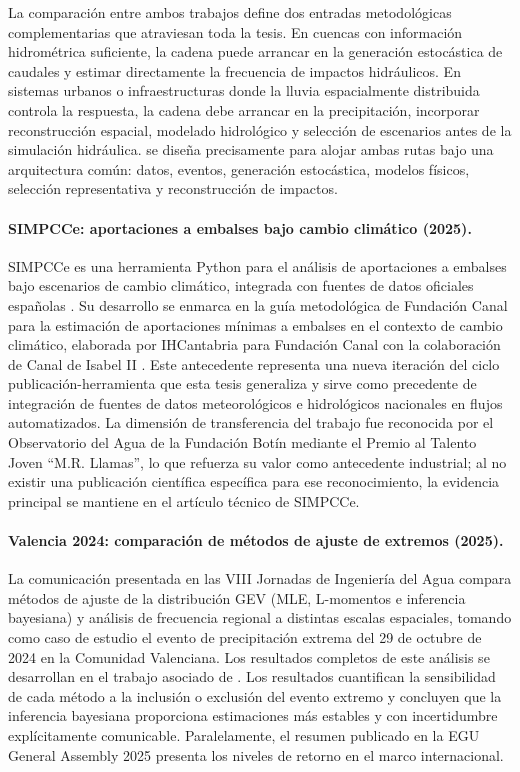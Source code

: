 La comparación entre ambos trabajos define dos entradas metodológicas complementarias que atraviesan toda la tesis. En cuencas con información hidrométrica suficiente, la cadena puede arrancar en la generación estocástica de caudales y estimar directamente la frecuencia de impactos hidráulicos. En sistemas urbanos o infraestructuras donde la lluvia espacialmente distribuida controla la respuesta, la cadena debe arrancar en la precipitación, incorporar reconstrucción espacial, modelado hidrológico y selección de escenarios antes de la simulación hidráulica. \hydra se diseña precisamente para alojar ambas rutas bajo una arquitectura común: datos, eventos, generación estocástica, modelos físicos, selección representativa y reconstrucción de impactos.

\paragraph{SIMPCCe: aportaciones a embalses bajo cambio climático (2025).}
SIMPCCe es una herramienta Python para el análisis de aportaciones a embalses bajo escenarios de cambio climático, integrada con fuentes de datos oficiales españolas \parencite{navas2025simpce}. Su desarrollo se enmarca en la guía metodológica de Fundación Canal para la estimación de aportaciones mínimas a embalses en el contexto de cambio climático, elaborada por IHCantabria para Fundación Canal con la colaboración de Canal de Isabel II \parencite{fundacioncanal2022guiaembalses}. Este antecedente representa una nueva iteración del ciclo publicación-herramienta que esta tesis generaliza y sirve como precedente de integración de fuentes de datos meteorológicos e hidrológicos nacionales en flujos automatizados. La dimensión de transferencia del trabajo fue reconocida por el Observatorio del Agua de la Fundación Botín mediante el Premio al Talento Joven ``M.R. Llamas'', lo que refuerza su valor como antecedente industrial; al no existir una publicación científica específica para ese reconocimiento, la evidencia principal se mantiene en el artículo técnico de SIMPCCe.

\paragraph{Valencia 2024: comparación de métodos de ajuste de extremos (2025).}
La comunicación presentada en las VIII Jornadas de Ingeniería del Agua \parencite{deljesus2025jia} compara métodos de ajuste de la distribución GEV (MLE, L-momentos e inferencia bayesiana) y análisis de frecuencia regional a distintas escalas espaciales, tomando como caso de estudio el evento de precipitación extrema del 29 de octubre de 2024 en la Comunidad Valenciana. Los resultados completos de este análisis se desarrollan en el trabajo asociado de \textcite{navas2025valenciaIA}. Los resultados cuantifican la sensibilidad de cada método a la inclusión o exclusión del evento extremo y concluyen que la inferencia bayesiana proporciona estimaciones más estables y con incertidumbre explícitamente comunicable. Paralelamente, el resumen publicado en la EGU General Assembly 2025 \parencite{deljesus2025valencia} presenta los niveles de retorno en el marco internacional.

